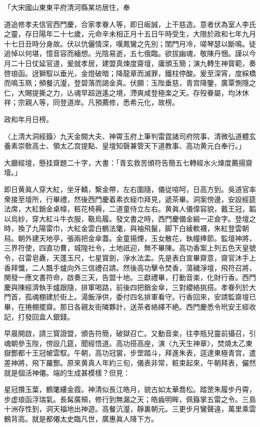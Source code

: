 「大宋國山東東平府清河縣某坊居住，奉

道追修孝夫信官西門慶，合家孝眷人等，即日皈誠，上干慈造。意者伏為室人李氏之靈，存日陽年二十七歲，元命辛未相正月十五日午時受生，大限於政和七年九月十七日丑時分身故。伏以伉儷情深，嘆鳳鸞之先別；閨門月冷，嗟琴瑟以斷鳴。徒追悼以何堪，憶音容而緬想。光陰易逝，五七俄臨。欲拔幽魂，敬陳丹悃。謹以今月二十日仗延官道，爰就孝居，建盟真煉度齋壇，庸頒玉簡；演九轉生神寳範，奏啓琅函。迓獅馭以垂光，金燈破暗；降龍章而滅罪，鐵柱停酸。爰至深宵，度綵橋而鳴玉珮；頻餐沆瀣，登碧落而謁金真。伏願：玉陛垂慈，青宫降鑒，廣覃惻隱之仁，大賜提撕之力，亾魂早超逍遙之境，滯爽咸登極楽之天。存殁眷屬，均沐休祥；宗親人等，同登道岸。凡預薦修，悉希元化，故榜。　

政和年月日榜。

〈上清大洞經籙〉九天金闕大夫、神霄玉府上筆判雷霆諸司府院事、清微弘道體玄養素崇敎高士、領太乙宫提點、皇壇知磬兼管天下道教事、高功黄元白奉行。」

大廳經壇，懸挂齋題二十字，大書：「青玄救苦頒符告簡五七轉經水火煉度薦揚齋壇。」

即日黄眞人穿大紅，坐牙轎，繫金帶，左右圍隨，儀従喧呵，日高方到。吳道官率衆接至壇所，行畢禮，然後西門慶着素衣絰巾拜見，遞茶畢。洞案傍邊，安設經筵法席，大紅銷金桌幃，粧花椅褥，二道童侍立左右。黄眞人儀偉容貌，戴王冠，韜以烏紗，穿大紅斗牛衣服，靸烏履。發文書之時，西門慶備金緞一疋僉字。登壇之時，換了九陽雷巾，大紅金雲白鶴法氅，與袖飛鬣，脚下白綾軟襪，朱紅登雲朝舄。朝外建天地亭，張兩把金傘蓋。金童揚煙，玉女散花，執幢捧節。監壇神將，三界符使，四直功曹，城隍社令，土地祇迎，無不畢陳。高功香案上列五色天皇號令，召雷皂纛，天蓬玉尺，七星寳劍，淨水法盂。先是表白宣畢齋意，齋官沐手上香拜懺，二人飄手爐向外三信禮召請。然後高功擊令焚香，蕩穢淨壇，飛符召將，関發一應文書符命，啟奏三天，告盟十地。三獻禮畢，打動音楽，化財行香。西門慶與陳經濟執手爐跟隨，排軍喝路，前後四把銷金傘，三對纓絡挑搭。孝眷列於大門首，孤魂棚建於街上。湯飯淨供，委付四名排軍看守。行香回來，安請監齋壇已畢，在捲棚擺齋。那日各親友街隣夥計，送茶者絡繹不絶。西門慶悉令玳安王經收記，打發回盒人銀錢。

早晨開啟，請三寳證盟，頒告符簡，破獄召亡。又動音楽，往李瓶兒靈前攝召，引魂朝參玉陛，傍設几筵，聞經悟道。高功搭高座，演〈九天生神章〉，焚燒太乙東嶽酆都十王冠帔雲馭。午朝，高功冠裳，步罡踏斗，拜進朱表，逕達東極青宫，遣差神將，飛下羅酆。原來黄真人年約三旬，儀表非常，粧束起來，午朝拜表，儼然就是個活神僊。端的生成甚模樣？但見：

星冠攢玉葉，鶴氅縷金霞。神清似長江皓月，貌古如太華喬松。踏罡朱履步丹霄，步虚琅函浮瑞氣。長髯廣頰，修行到無漏之天；皓齒明眸，佩籙掌五雷之令。三島十洲存性到，洞天福地出神遊。高餐沆瀣，靜裏朝元。三更步月鸞聲遠，萬里乘雲鶴背高。就是都僊太史臨凡世，廣惠眞人降下方。

